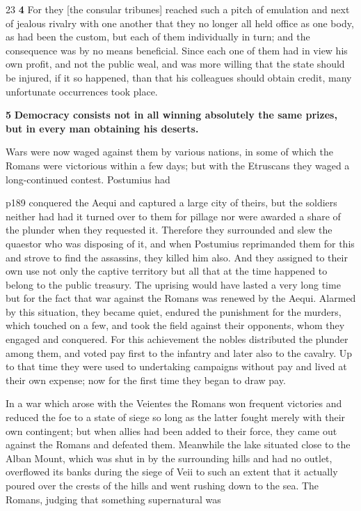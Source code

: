 23
\textbf{4} For they [the consular tribunes] reached such a pitch of emulation and next of jealous rivalry with one another that they no longer all held office as one body, as had been the custom, but each of them individually in turn; and the consequence was by no means beneficial. Since each one of them had in view his own profit, and not the public weal, and was more willing that the state should be injured, if it so happened, than that his colleagues should obtain credit, many unfortunate occurrences took place.

\textbf{5} \textbf{Democracy consists not in all winning absolutely the same prizes, but in every man obtaining his deserts.}

Wars were now waged against them by various nations, in some of which the Romans were victorious within a few days; but with the Etruscans they waged a long-continued contest. Postumius had

p189 conquered the Aequi and captured a large city of theirs, but the soldiers neither had had it turned over to them for pillage nor were awarded a share of the plunder when they requested it. Therefore they surrounded and slew the quaestor who was disposing of it, and when Postumius reprimanded them for this and strove to find the assassins, they killed him also. And they assigned to their own use not only the captive territory but all that at the time happened to belong to the public treasury. The uprising would have lasted a very long time but for the fact that war against the Romans was renewed by the Aequi. Alarmed by this situation, they became quiet, endured the punishment for the murders, which touched on a few, and took the field against their opponents, whom they engaged and conquered. For this achievement the nobles distributed the plunder among them, and voted pay first to the infantry and later also to the cavalry. Up to that time they were used to undertaking campaigns without pay and lived at their own expense; now for the first time they began to draw pay.

In a war which arose with the Veientes the Romans won frequent victories and reduced the foe to a state of siege so long as the latter fought merely with their own contingent; but when allies had been added to their force, they came out against the Romans and defeated them. Meanwhile the lake situated close to the Alban Mount, which was shut in by the surrounding hills and had no outlet, overflowed its banks during the siege of Veii to such an extent that it actually poured over the crests of the hills and went rushing down to the sea. The Romans, judging that something supernatural was

